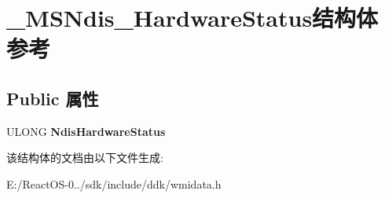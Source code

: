\hypertarget{struct___m_s_ndis___hardware_status}{}\section{\+\_\+\+M\+S\+Ndis\+\_\+\+Hardware\+Status结构体 参考}
\label{struct___m_s_ndis___hardware_status}
\subsection*{Public 属性}
\begin{DoxyCompactItemize}
\item 
\mbox{\label{struct___m_s_ndis___hardware_status_a7c230e96cbe0d21f168e9cf01bfba1f1}} 
U\+L\+O\+NG {\bfseries Ndis\+Hardware\+Status}
\end{DoxyCompactItemize}


该结构体的文档由以下文件生成\+:\begin{DoxyCompactItemize}
\item 
E\+:/\+React\+O\+S-\/0../sdk/include/ddk/wmidata.\+h\end{DoxyCompactItemize}
